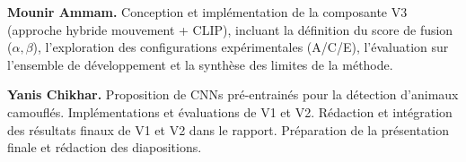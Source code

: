 \documentclass{article}
\begin{document}
\textbf{Mounir Ammam.} Conception et implémentation de la composante V3 (approche hybride mouvement + CLIP), incluant la définition du score de fusion ($\alpha,\beta$), l’exploration des configurations expérimentales (A/C/E), l’évaluation sur l’ensemble de développement et la synthèse des limites de la méthode.

\textbf{Yanis Chikhar.} Proposition de CNNs pré-entrainés pour la détection d'animaux camouflés. Implémentations et évaluations de V1 et V2. Rédaction et intégration des résultats finaux de V1 et V2 dans le rapport. Préparation de la présentation finale et rédaction des diapositions.



\end{document}
